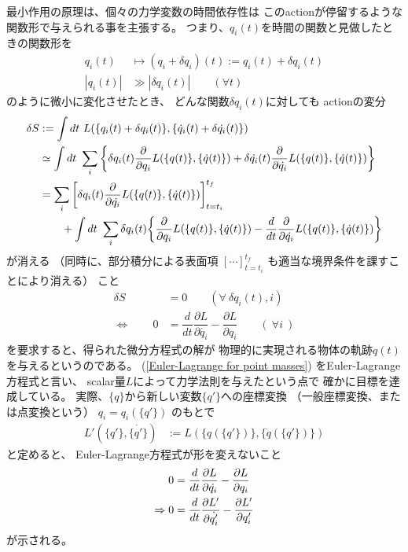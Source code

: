 最小作用の原理は、個々の力学変数の時間依存性は
このactionが停留するような関数形で与えられる事を主張する。
つまり、$q_i(t)$を時間の関数と見做したときの関数形を
\begin{align}
  q_i(t) &\mapsto (q_i+\delta q_i)(t) := q_i(t) + \delta q_i(t)
  \\
  | q_i(t) | & \gg | \delta q_i(t) |
  \qquad (\forall t)
\end{align}
のように微小に変化させたとき、
どんな関数$\delta q_i(t)$に対しても
actionの変分
\begin{align}
  \delta S &:= \int dt\ L(\{ q_i(t) + \delta q_i(t) \},
  \{ \dot{q}_i(t) + \delta \dot{q_i}(t) \} )
\notag\\&\simeq
  \int dt\ \sum_i
  \bigg\{
    \delta q_i(t)
    \dfrac{\partial}{\partial q_i}
    L(\{ q(t) \},
    \{ \dot{q}(t) \} )
+
    \delta \dot{q_i}(t)
    \dfrac{\partial}{\partial \dot{q_i}}
    L(\{ q(t) \},
    \{ \dot{q}(t) \} )
  \bigg\}
\notag\\&=
  \sum_i
  \bigg[
    \delta q_i(t)
    \dfrac{\partial}{\partial \dot{q_i}}
    L(\{ q(t) \},
    \{ \dot{q}(t) \} )
  \bigg]_{t=t_i}^{t_f}
\notag\\&\qquad
  +
\int dt\ \sum_i
\delta q_i(t)
\bigg\{
  \dfrac{\partial}{\partial q_i}
  L(\{ q(t) \},
  \{ \dot{q}(t) \} )
-
  \dfrac{d}{dt}
  \dfrac{\partial}{\partial \dot{q_i}}
  L(\{ q(t) \},
  \{ \dot{q}(t) \} )
\bigg\}
\end{align}
が消える
（同時に、部分積分による表面項
$[\cdots]_{t=t_i}^{t_f}$
も適当な境界条件を課すことにより消える）
こと
\begin{align}
  \delta S &= 0
  \qquad (\forall\ \delta q_i(t), i)
\\\Leftrightarrow\qquad
  0 &= 
  \dfrac{d}{dt}\dfrac{\partial L}{\partial \dot{q_i} }
  - \dfrac{\partial L}{\partial q_i }
  \qquad (\ \forall i\ )
\label{Euler-Lagrange for point masses}
\end{align}
を要求すると、得られた微分方程式の解が
物理的に実現される物体の軌跡${q(t)}$
を与えるというのである。
(\ref{Euler-Lagrange for point masses})
をEuler-Lagrange方程式と言い、
scalar量$L$によって力学法則を与えたという点で
確かに目標を達成している。
実際、$\{q\}$から新しい変数$\{ q'\}$への座標変換
（一般座標変換、または点変換という）
$q_i = q_i(\{q'\})$
のもとで
\begin{align}
  L'(\{q'\}, \{\dot{q'}\}) &:= L(\{q(\{q'\})\}, \{\dot{q}(\{q'\})\})
\end{align}
と定めると、
Euler-Lagrange方程式が形を変えないこと
\begin{align}
  0 &= 
  \dfrac{d}{dt}\dfrac{\partial L}{\partial \dot{q_i} }
  - \dfrac{\partial L}{\partial q_i }
\notag\\\Rightarrow
0 &= 
\dfrac{d}{dt}\dfrac{\partial L'}{\partial \dot{q'_i} }
- \dfrac{\partial L'}{\partial q_i' }
\label{point transformation}
\end{align}
が示される。

